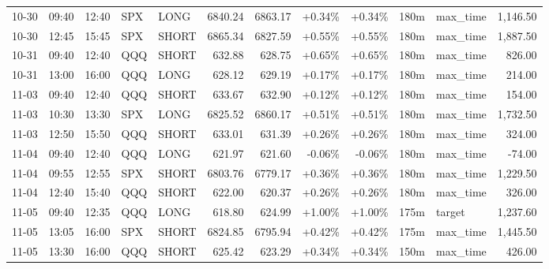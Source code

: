 \documentclass[11pt,a4paper,twoside]{article}
\begin{document}
\begin{center}
\begin{longtable}{>{\color{txtmain}}l l l l l r r r r r >{\color{txtmain}}l r}
10-30 & 09:40 & 12:40 & SPX & LONG & 6840.24 & 6863.17 & \textcolor{wingreen}{+0.34\%} & \textcolor{wingreen}{+0.34\%} & 180m & max\_time & \textcolor{wingreen}{1,146.50} \\
10-30 & 12:45 & 15:45 & SPX & SHORT & 6865.34 & 6827.59 & \textcolor{wingreen}{+0.55\%} & \textcolor{wingreen}{+0.55\%} & 180m & max\_time & \textcolor{wingreen}{1,887.50} \\
10-31 & 09:40 & 12:40 & QQQ & SHORT & 632.88 & 628.75 & \textcolor{wingreen}{+0.65\%} & \textcolor{wingreen}{+0.65\%} & 180m & max\_time & \textcolor{wingreen}{826.00} \\
10-31 & 13:00 & 16:00 & QQQ & LONG & 628.12 & 629.19 & \textcolor{wingreen}{+0.17\%} & \textcolor{wingreen}{+0.17\%} & 180m & max\_time & \textcolor{wingreen}{214.00} \\
11-03 & 09:40 & 12:40 & QQQ & SHORT & 633.67 & 632.90 & \textcolor{wingreen}{+0.12\%} & \textcolor{wingreen}{+0.12\%} & 180m & max\_time & \textcolor{wingreen}{154.00} \\
11-03 & 10:30 & 13:30 & SPX & LONG & 6825.52 & 6860.17 & \textcolor{wingreen}{+0.51\%} & \textcolor{wingreen}{+0.51\%} & 180m & max\_time & \textcolor{wingreen}{1,732.50} \\
11-03 & 12:50 & 15:50 & QQQ & SHORT & 633.01 & 631.39 & \textcolor{wingreen}{+0.26\%} & \textcolor{wingreen}{+0.26\%} & 180m & max\_time & \textcolor{wingreen}{324.00} \\
11-04 & 09:40 & 12:40 & QQQ & LONG & 621.97 & 621.60 & \textcolor{lossred}{-0.06\%} & \textcolor{lossred}{-0.06\%} & 180m & max\_time & \textcolor{lossred}{-74.00} \\
11-04 & 09:55 & 12:55 & SPX & SHORT & 6803.76 & 6779.17 & \textcolor{wingreen}{+0.36\%} & \textcolor{wingreen}{+0.36\%} & 180m & max\_time & \textcolor{wingreen}{1,229.50} \\
11-04 & 12:40 & 15:40 & QQQ & SHORT & 622.00 & 620.37 & \textcolor{wingreen}{+0.26\%} & \textcolor{wingreen}{+0.26\%} & 180m & max\_time & \textcolor{wingreen}{326.00} \\
11-05 & 09:40 & 12:35 & QQQ & LONG & 618.80 & 624.99 & \textcolor{wingreen}{+1.00\%} & \textcolor{wingreen}{+1.00\%} & 175m & target & \textcolor{wingreen}{1,237.60} \\
11-05 & 13:05 & 16:00 & SPX & SHORT & 6824.85 & 6795.94 & \textcolor{wingreen}{+0.42\%} & \textcolor{wingreen}{+0.42\%} & 175m & max\_time & \textcolor{wingreen}{1,445.50} \\
11-05 & 13:30 & 16:00 & QQQ & SHORT & 625.42 & 623.29 & \textcolor{wingreen}{+0.34\%} & \textcolor{wingreen}{+0.34\%} & 150m & max\_time & \textcolor{wingreen}{426.00} \\

\end{longtable}
\end{center}
\end{document}
